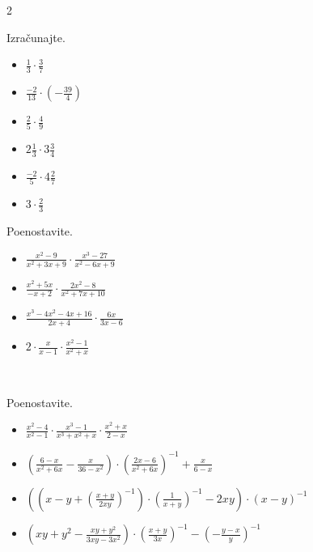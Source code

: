         \begin{multicols}{2}
        
            \begin{naloga}
                Izračunajte.
                \begin{itemize}
                            \item $\frac{1}{3}\cdot \frac{3}{7}$ 
                            \item $\frac{-2}{13}\cdot \left(-\frac{39}{4}\right)$ 
                            \item $\frac{2}{5}\cdot \frac{4}{9}$ 
                            \item $2\frac{1}{3}\cdot 3\frac{3}{4}$ 
                            \item $\frac{-2}{5}\cdot 4\frac{2}{7}$ 
                            \item $3\cdot\frac{2}{3}$ 
                \end{itemize}
            \end{naloga}
        


        
            \begin{naloga}
                Poenostavite.
                \begin{itemize}
                    \item $\frac{x^2-9}{x^2+3x+9}\cdot\frac{x^3-27}{x^2-6x+9}$ 
                    \item $\frac{x^2+5x}{-x+2}\cdot\frac{2x^2-8}{x^2+7x+10}$ 
                    \item $\frac{x^3-4x^2-4x+16}{2x+4}\cdot\frac{6x}{3x-6}$ 
                    \item $2\cdot\frac{x}{x-1}\cdot\frac{x^2-1}{x^2+x}$ 
                \end{itemize}
            \end{naloga}
        

            
        \end{multicols}

        ~

            \begin{naloga}
                Poenostavite.
                \begin{itemize}
                    \item $\frac{x^2-4}{x^2-1}\cdot\frac{x^3-1}{x^3+x^2+x}\cdot\frac{x^2+x}{2-x}$ 
                    \item $\left(\frac{6-x}{x^2+6x}-\frac{x}{36-x^2}\right)\cdot\left(\frac{2x-6}{x^2+6x}\right)^{-1}+\frac{x}{6-x}$ 
                    \item $\left(\left(x-y+\left(\frac{x+y}{2xy}\right)^{-1}\right)\cdot\left(\frac{1}{x+y}\right)^{-1}-2xy\right)\cdot(x-y)^{-1}$ 
                    \item $\left(xy+y^2-\frac{xy+y^2}{3xy-3x^2}\right)\cdot\left(\frac{x+y}{3x}\right)^{-1}-\left(-\frac{y-x}{y}\right)^{-1}$ 
                \end{itemize}
            \end{naloga}
        


